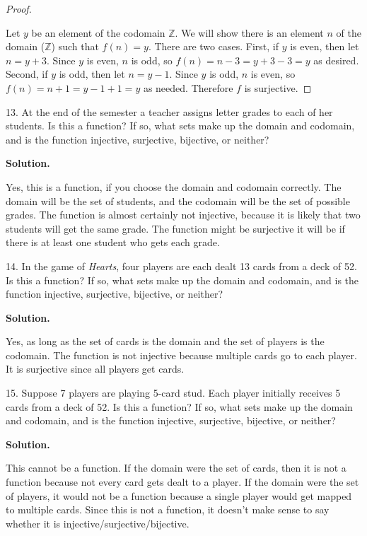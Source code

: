 \documentclass[10pt,]{book}
\theoremstyle{plain}
\theoremstyle{definition}
\theoremstyle{definition}
\theoremstyle{definition}
\numberwithin{equation}{section}
\def\Z{\mathbb Z}
\begin{document}
\begin{exerciselist}
\begin{enumerate}[label=(\alph*)]
\begin{proof}\hypertarget{proof-2}{}

Let \(y\) be an element of the codomain \(\Z\). We will show there is an element \(n\) of the domain (\(\Z\)) such that \(f(n) = y\). There are two cases. First, if \(y\) is even, then let \(n = y+3\). Since \(y\) is even, \(n\) is odd, so \(f(n) = n-3 = y+3-3 = y\) as desired. Second, if \(y\) is odd, then let \(n = y-1\). Since \(y\) is odd, \(n\) is even, so \(f(n) = n+1 = y-1+1 = y\) as needed. Therefore \(f\) is surjective.
%
\end{proof}
\end{enumerate}
\item[13.]\hypertarget{exercise-39}{}
At the end of the semester a teacher assigns letter grades to each of her students. Is this a function? If so, what sets make up the domain and codomain, and is the function injective, surjective, bijective, or neither?
%
\par\smallskip
\par\smallskip
\noindent\textbf{Solution.}\hypertarget{solution-57}{}\quad

Yes, this is a function, if you choose the domain and codomain correctly. The domain will be the set of students, and the codomain will be the set of possible grades. The function is almost certainly not injective, because it is likely that two students will get the same grade. The function might be surjective \textendash{} it will be if there is at least one student who gets each grade.
%
\item[14.]\hypertarget{exercise-40}{}
In the game of \emph{Hearts}, four players are each dealt 13 cards from a deck of 52. Is this a function? If so, what sets make up the domain and codomain, and is the function injective, surjective, bijective, or neither?
%
\par\smallskip
\par\smallskip
\noindent\textbf{Solution.}\hypertarget{solution-58}{}\quad

Yes, as long as the set of cards is the domain and the set of players is the codomain. The function is not injective because multiple cards go to each player. It is surjective since all players get cards.
%
\item[15.]\hypertarget{exercise-41}{}
Suppose 7 players are playing 5-card stud. Each player initially receives 5 cards from a deck of 52. Is this a function? If so, what sets make up the domain and codomain, and is the function injective, surjective, bijective, or neither?
%
\par\smallskip
\par\smallskip
\noindent\textbf{Solution.}\hypertarget{solution-59}{}\quad

This cannot be a function. If the domain were the set of cards, then it is not a function because not every card gets dealt to a player. If the domain were the set of players, it would not be a function because a single player would get mapped to multiple cards. Since this is not a function, it doesn't make sense to say whether it is injective/surjective/bijective.
%
\end{exerciselist}
\end{document}
